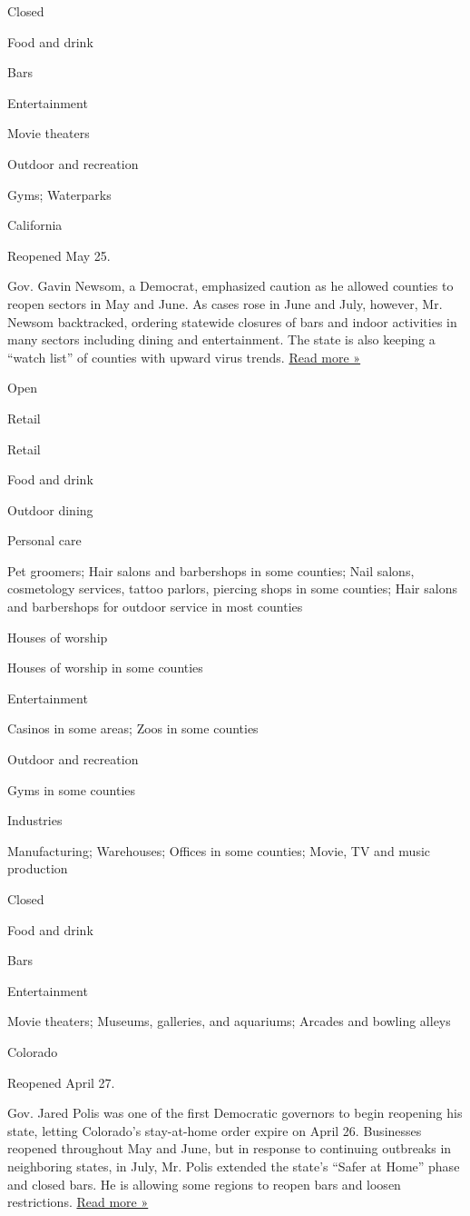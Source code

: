 Closed

Food and drink

Bars

Entertainment

Movie theaters

Outdoor and recreation

Gyms; Waterparks

California

Reopened May 25.

Gov. Gavin Newsom, a Democrat, emphasized caution as he allowed counties
to reopen sectors in May and June. As cases rose in June and July,
however, Mr. Newsom backtracked, ordering statewide closures of bars and
indoor activities in many sectors including dining and entertainment.
The state is also keeping a ``watch list'' of counties with upward virus
trends.
\href{https://www.latimes.com/projects/california-coronavirus-cases-tracking-outbreak/reopening-across-counties/}{Read
more »}

Open

Retail

Retail

Food and drink

Outdoor dining

Personal care

Pet groomers; Hair salons and barbershops in some counties; Nail salons,
cosmetology services, tattoo parlors, piercing shops in some counties;
Hair salons and barbershops for outdoor service in most counties

Houses of worship

Houses of worship in some counties

Entertainment

Casinos in some areas; Zoos in some counties

Outdoor and recreation

Gyms in some counties

Industries

Manufacturing; Warehouses; Offices in some counties; Movie, TV and music
production

Closed

Food and drink

Bars

Entertainment

Movie theaters; Museums, galleries, and aquariums; Arcades and bowling
alleys

Colorado

Reopened April 27.

Gov. Jared Polis was one of the first Democratic governors to begin
reopening his state, letting Colorado's stay-at-home order expire on
April 26. Businesses reopened throughout May and June, but in response
to continuing outbreaks in neighboring states, in July, Mr. Polis
extended the state's ``Safer at Home'' phase and closed bars. He is
allowing some regions to reopen bars and loosen restrictions.
\href{https://denver.cbslocal.com/2020/06/30/polis-colorado-bars-coronavirus/}{Read
more »}

